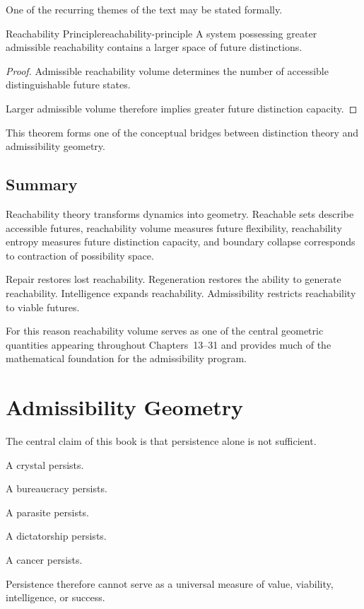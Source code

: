 \documentclass[12pt,twoside,openright]{book}
\begin{document}
One of the recurring themes of the text may be stated
formally.

\begin{theorem}{Reachability Principle}{reachability-principle}
A system possessing greater admissible reachability
contains a larger space of future distinctions.
\end{theorem}

\begin{proof}
Admissible reachability volume determines the number of
accessible distinguishable future states.

Larger admissible volume therefore implies greater future
distinction capacity.
\end{proof}

This theorem forms one of the conceptual bridges between
distinction theory and admissibility geometry.

\subsection{Summary}

Reachability theory transforms dynamics into geometry.
Reachable sets describe accessible futures, reachability
volume measures future flexibility, reachability entropy
measures future distinction capacity, and boundary
collapse corresponds to contraction of possibility space.

Repair restores lost reachability. Regeneration restores
the ability to generate reachability. Intelligence
expands reachability. Admissibility restricts
reachability to viable futures.

For this reason reachability volume serves as one of the
central geometric quantities appearing throughout
Chapters~13--31 and provides much of the mathematical
foundation for the admissibility program.

\section{Admissibility Geometry}

The central claim of this book is that persistence alone
is not sufficient.

A crystal persists.

A bureaucracy persists.

A parasite persists.

A dictatorship persists.

A cancer persists.

Persistence therefore cannot serve as a universal measure
of value, viability, intelligence, or success.
\end{document}
